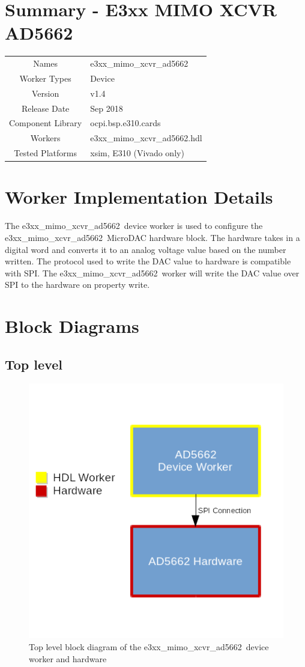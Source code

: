 \documentclass{article}
\author{} %
\date{Version \docVersion} %
\title{\docTitle}
\def\docVersion{1.4}
\def\comp{e3xx\_mimo\_xcvr\_ad5662}
\def\Comp{E3xx MIMO XCVR AD5662}
\begin{document}
\section*{Summary - \Comp}
\begin{tabular}{|c|M{13.5cm}|}
	\hline
	                  &                                      \\
	\hline
	Names              & \comp                        \\
	\hline
	Worker Types       & Device \\
	\hline
	Version           & v\docVersion \\
	\hline
	Release Date      & Sep 2018 \\
	\hline
	Component Library & ocpi.bsp.e310.cards \\
	\hline
	Workers           & \comp.hdl                \\
	\hline
	Tested Platforms  & xsim, E310 (Vivado only)                       \\
	\hline
\end{tabular}

\section*{Worker Implementation Details}
The \comp\ device worker is used to configure the \comp\ MicroDAC hardware block. The hardware takes in a digital word and converts it to an analog voltage value based on the number written. The protocol used to write the DAC value to hardware is compatible with SPI. The \comp\ worker will write the DAC value over SPI to the hardware on property write.
\section*{Block Diagrams}
\subsection*{Top level}
\begin{figure}[ht]
	\centerline{\includegraphics[scale=0.75]{top_level_diagram}}
	\caption{Top level block diagram of the \comp\ device worker and hardware}
	\label{fig:tb}
\end{figure}
\flushleft
\end{document}
